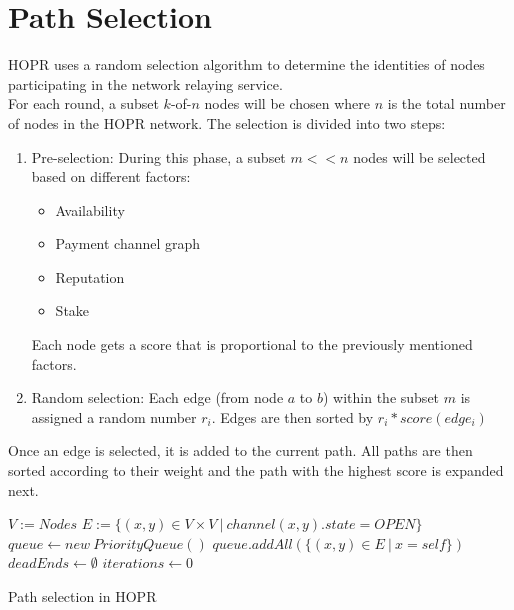 \section{Path Selection}
HOPR uses a random selection algorithm to determine the identities of nodes participating in the network relaying service.
\\For each round, a subset $k$-of-$n$ nodes will be chosen where $n$ is the total number of nodes in the HOPR network. The selection is divided into two steps:
\begin{enumerate}
    \item Pre-selection:
          During this phase, a subset $m<<n$ nodes will be selected based on different factors:
          \begin{itemize}
              \item Availability
              \item Payment channel graph
              \item Reputation
              \item Stake
          \end{itemize}
          Each node gets a score that is proportional to the previously mentioned factors.
    \item Random selection:
          Each edge (from node $a$ to $b$) within the subset $m$ is assigned a random number $r_i$. Edges are then sorted by $r_i*score(edge_i)$
\end{enumerate}
Once an edge is selected, it is added to the current path. All paths are then sorted according to their weight and the path with the highest score is expanded next.

\begin{algorithm}
    \SetAlgoNoLine
    \DontPrintSemicolon
    $ V := Nodes$\;
    $ E := \{ (x, y) \in V \times V \ | \ channel(x,y).state = OPEN \}$\;
    \;
    $queue \leftarrow new \ PriorityQueue()$\;
    $queue.addAll(\{ (x,y) \in E \ | \ x = self \})$\;
    $deadEnds \leftarrow \emptyset$\;
    $iterations \leftarrow 0$\;
    \Return{$\bot$}
    \caption{Path selection in HOPR}
\end{algorithm}

